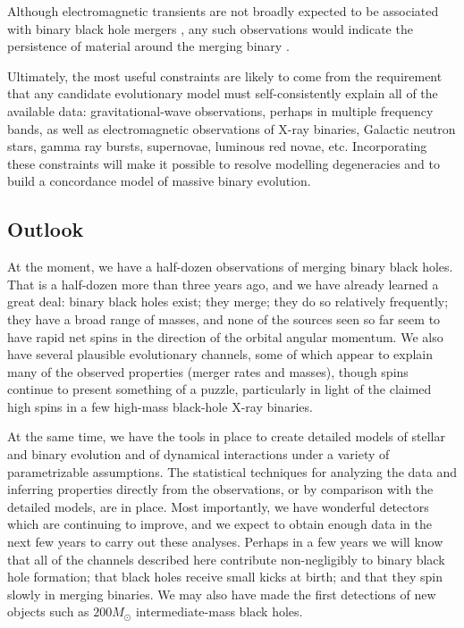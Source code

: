 \documentclass[iop,onecolumn]{revtex4}
\newcommand{\todo}[1]{\textcolor{red}{#1}}
\begin{document}
Although electromagnetic transients are not broadly expected to be associated with binary black hole mergers \citep[e.g.,][]{Lyutikov:2016}, any such observations would indicate the persistence of material around the merging binary \citep[e.g.,][]{deMinkKing:2017}.  %

Ultimately, the most useful constraints are likely to come from the requirement that any candidate evolutionary model must self-consistently explain all of the available data: gravitational-wave observations, perhaps in multiple frequency bands, as well as electromagnetic observations of X-ray binaries, Galactic neutron stars, gamma ray bursts, supernovae, luminous red novae, etc. Incorporating these constraints will make it possible to resolve modelling degeneracies and to build a concordance model of massive binary evolution.  

\subsection{Outlook}

At the moment, we have a half-dozen observations of merging binary black holes.  That is a half-dozen more than three years ago, and we have already learned a great deal: binary black holes exist; they merge; they do so relatively frequently; they have a broad range of masses, and none of the sources seen so far seem to have rapid net spins in the direction of the orbital angular momentum.  We also have several plausible evolutionary channels, some of which appear to explain many of the observed properties (merger rates and masses), though spins continue to present something of a puzzle, particularly in light of the claimed high spins in a few high-mass black-hole X-ray binaries.

At the same time, we have the tools in place to create detailed models of stellar and binary evolution and of dynamical interactions under a variety of parametrizable assumptions.  The statistical techniques for analyzing the data and inferring properties directly from the observations, or by comparison with the detailed models, are in place.  Most importantly, we have wonderful detectors which are continuing to improve, and we expect to obtain enough data in the next few years to carry out these analyses.  Perhaps in a few years we will know that all of the channels described here contribute non-negligibly to binary black hole formation; that black holes receive small kicks at birth; and that they spin slowly in merging binaries. We may also have made the first detections of new objects such as $200 M_\odot$ intermediate-mass black holes.
\end{document}
